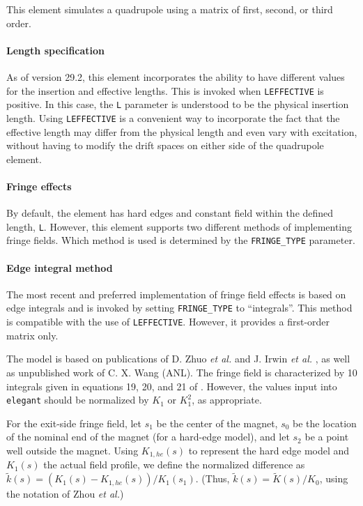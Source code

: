 This element simulates a quadrupole using a matrix of first, second,
or third order.

\paragraph{Length specification}
As of version 29.2, this element incorporates the ability to have different values for the insertion
and effective lengths. This is invoked when \verb|LEFFECTIVE| is positive. In this case, the
\verb|L| parameter is understood to be the physical insertion length. Using \verb|LEFFECTIVE| is
a convenient way to incorporate the fact that the effective length may differ from the physical
length and even vary with excitation, without having to modify the drift spaces on either side of
the quadrupole element.

\paragraph{Fringe effects}
By default, the element has hard edges and constant field within the
defined length, {\tt L}.  However, this element supports two different methods of implementing fringe fields.
Which method is used is determined by the \verb|FRINGE_TYPE| parameter.

\paragraph{Edge integral method} The most recent and preferred implementation of fringe field effects is based on edge
integrals and is invoked by setting \verb|FRINGE_TYPE| to ``integrals''.  This method is compatible with the use of
\verb|LEFFECTIVE|. However, it provides a first-order matrix only.

The model is based on publications of D.  Zhuo {\em et al.} \cite{Zhou-IPAC10} and  J. Irwin {\em et
  al.} \cite{Irwin-PAC95}, as well as unpublished work of C. X. Wang (ANL).  The fringe field is characterized by 
10 integrals given in equations 19, 20, and 21 of \cite{Zhou-IPAC10}.  However, the values input into {\tt elegant}
should be normalized by $K_1$ or $K_1^2$, as appropriate.

For the exit-side fringe field, let $s_1$ be the center of the magnet, $s_0$ be the location of the nominal end of the magnet
(for a hard-edge model), and let $s_2$ be a point well outside the magnet.  
Using $K_{1,he}(s)$ to represent the hard edge model and $K_1(s)$ the actual field profile, we 
define the normalized difference as $\tilde{k}(s) = (K_1(s) - K_{1,he}(s))/K_1(s_1)$.  (Thus, $\tilde{k}(s) = \tilde{K}(s)/K_0$, using
the notation of Zhou {\em et al.})

